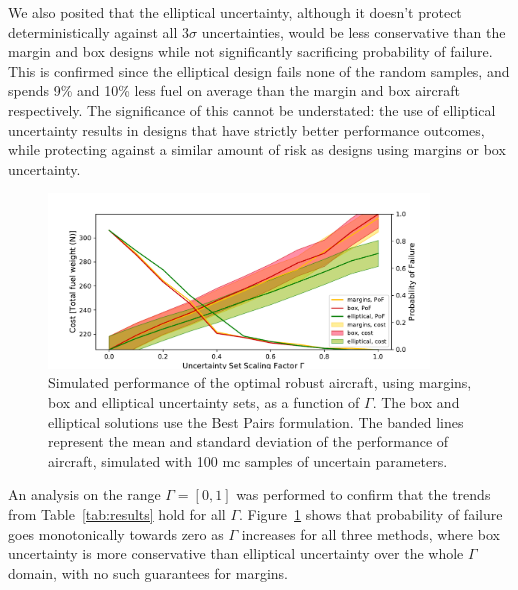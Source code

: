 We also posited that the elliptical uncertainty, although it doesn't
protect deterministically against all $3\sigma$ uncertainties, would be less conservative than the
margin and box designs while not significantly sacrificing probability of failure. This is
confirmed since the elliptical design fails none of the random samples,
and spends 9\% and 10\% less fuel on average
than the margin and box aircraft respectively.
The significance of this cannot be understated: the use of elliptical uncertainty
results in designs that have strictly better performance outcomes, while protecting
against a similar amount of risk as designs using margins or box uncertainty.

\begin{figure}[ht]
    \centering
    \captionsetup{justification=centering, font=small}
    \includegraphics[width=0.9\textwidth]{pof_and_cost.pdf}
    \caption{Simulated performance of the optimal robust aircraft, using margins, box and elliptical uncertainty sets,
    as a function of $\Gamma$. The box and elliptical solutions use the Best Pairs formulation.
    The banded lines represent the mean and standard deviation of the performance
    of aircraft, simulated with 100 \gls{mc} samples of uncertain parameters.}
    \label{fig:probOfFailure}
\end{figure}

An analysis on the range $\Gamma=[0,1]$ was performed to confirm that the trends from
Table~\ref{tab:results} hold for all $\Gamma$. Figure~\ref{fig:probOfFailure}
shows that probability of failure goes monotonically
towards zero as $\Gamma$ increases for all three methods, where box uncertainty is
more conservative than elliptical uncertainty over the whole $\Gamma$ domain, with no
such guarantees for margins.


